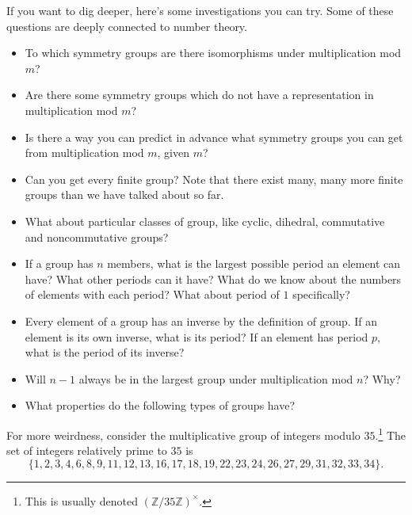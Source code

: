 \documentclass[../textbook.tex]{subfiles}
\begin{document}
\noindent If you want to dig deeper, here's some investigations you can try. Some of these questions are deeply connected to number theory.
\begin{itemize}
\item To which symmetry groups are there isomorphisms under multiplication mod $m$?
\item Are there some symmetry groups which do not have a representation in multiplication mod $m$?
\item Is there a way you can predict in advance what symmetry groups you can get from multiplication mod $m$, given $m$?
\item Can you get every finite group? Note that there exist many, many more finite groups than we have talked about so far.
\item What about particular classes of group, like cyclic, dihedral, commutative and noncommutative groups?
\item If a group has $n$ members, what is the largest possible period an element can have? What other periods can it have? What do we know about the numbers of elements with each period? What about period of $1$ specifically?
\item Every element of a group has an inverse by the definition of group. If an element is its own inverse, what is its period? If an element has period $p$, what is the period of its inverse?
\item Will $n-1$ always be in the largest group under multiplication mod $n$? Why?
\item What properties do the following types of groups have?
\begin{enumerate}
\end{enumerate}
\end{itemize}


\noindent For more weirdness, consider the multiplicative group of integers modulo $35$.\footnote{This is usually denoted $(\mathbb{Z}/35\mathbb{Z})^\times$.} The set of integers relatively prime to $35$ is $$\{1,2,3,4,6,8,9,11,12,13,16,17,18,19,22,23,24,26,27,29,31,32,33,34\}.$$
\end{document}
